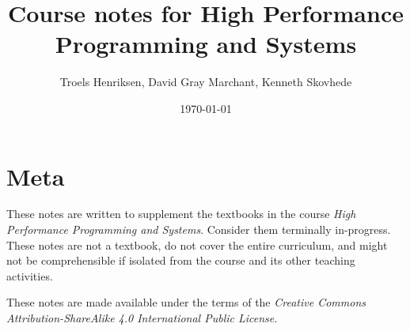\documentclass[oneside]{memoir}
\title{Course notes for High Performance Programming and Systems}
\author{Troels Henriksen, David Gray Marchant, Kenneth Skovhede} \date{\today}
\begin{document}
\maketitle

\section{Meta}

These notes are written to supplement the textbooks in the course
\textit{High Performance Programming and Systems}.  Consider them
terminally in-progress.  These notes are not a textbook, do not cover
the entire curriculum, and might not be comprehensible if isolated
from the course and its other teaching activities.

These notes are made available under the terms of the \emph{Creative
  Commons Attribution-ShareAlike 4.0 International Public License}.

\newpage
\tableofcontents

\newpage
\listoftheorems[title=Definitions,ignoreall,show={definition}]



























\newpage



\end{document}
